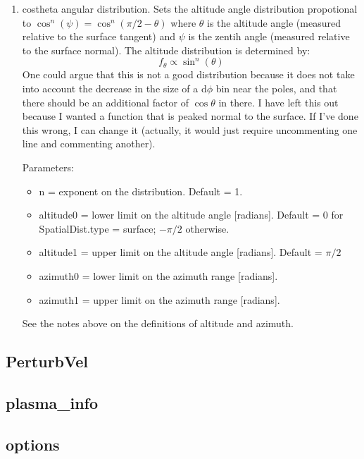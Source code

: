 \documentclass[11pt]{article}
\begin{document}
\begin{enumerate}
\item costheta angular distribution. Sets the altitude angle distribution
propotional to $\cos^n(\psi)=\cos^n(\pi/2-\theta)$ where $\theta$ is the 
altitude
angle (measured relative to the surface tangent) and $\psi$ is the zentih angle
(measured relative to the surface normal). The altitude distribution is
determined by:
\begin{equation}
f_\theta \propto \sin^n(\theta)
\end{equation}
One could argue that this is not a good distribution because it does not take
into account the decrease in the size of a d$\phi$ bin near the poles, and that
there should be an additional factor of $\cos \theta$ in there. I have left
this out because I wanted a function that is peaked normal to the surface. If
I've done this wrong, I can change it (actually, it would just require
uncommenting one line and commenting another).

Parameters:
  \begin{itemize}
  \item {\color{red}n} = exponent on the distribution. Default = 1.
  \item {\color{red}altitude0} = lower limit on the altitude angle [radians].
  Default = 0 for SpatialDist.type = surface; $-\pi/2$ otherwise.
  \item {\color{red}altitude1} = upper limit on the altitude angle [radians].
  Default = $\pi/2$
  \item {\color{red}azimuth0} = lower limit on the azimuth range [radians].
  \item {\color{red}azimuth1} = upper limit on the azimuth range [radians].
  \end{itemize}
See the notes above on the definitions of altitude and azimuth.

\end{enumerate}

\subsection{PerturbVel}

\subsection{plasma\_info}

\subsection{options}
\end{document}
